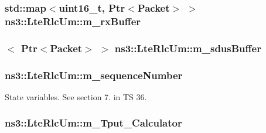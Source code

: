 \subsubsection[{\texorpdfstring{m\+\_\+rx\+Buffer}{m_rxBuffer}}]{\setlength{\rightskip}{0pt plus 5cm}std\+::map$<$uint16\+\_\+t, {\bf Ptr}$<${\bf Packet}$>$ $>$ ns3\+::\+Lte\+Rlc\+Um\+::m\+\_\+rx\+Buffer\hspace{0.3cm}{\ttfamily [private]}}\hypertarget{classns3_1_1LteRlcUm_aa4611282929afb798d591eafca1e6adb}{}\label{classns3_1_1LteRlcUm_aa4611282929afb798d591eafca1e6adb}
\subsubsection[{\texorpdfstring{m\+\_\+sdus\+Buffer}{m_sdusBuffer}}]{$<$ {\bf Ptr}$<${\bf Packet}$>$ $>$ ns3\+::\+Lte\+Rlc\+Um\+::m\+\_\+sdus\+Buffer\hspace{0.3cm}{\ttfamily [private]}}\hypertarget{classns3_1_1LteRlcUm_a8c214e654b315fe09e26db669a6af268}{}\label{classns3_1_1LteRlcUm_a8c214e654b315fe09e26db669a6af268}
\subsubsection[{\texorpdfstring{m\+\_\+sequence\+Number}{m_sequenceNumber}}]{ ns3\+::\+Lte\+Rlc\+Um\+::m\+\_\+sequence\+Number\hspace{0.3cm}{\ttfamily [private]}}\hypertarget{classns3_1_1LteRlcUm_afd06062cf128aecdc2f7c3f29ea8a8ad}{}\label{classns3_1_1LteRlcUm_afd06062cf128aecdc2f7c3f29ea8a8ad}
State variables. See section 7. in TS 36. 
\subsubsection[{\texorpdfstring{m\+\_\+\+Tput\+\_\+\+Calculator}{m_Tput_Calculator}}]{ ns3\+::\+Lte\+Rlc\+Um\+::m\+\_\+\+Tput\+\_\+\+Calculator\hspace{0.3cm}{\ttfamily [private]}}\hypertarget{classns3_1_1LteRlcUm_af24ae932eded5469f4ad2185b656bee1}{}\label{classns3_1_1LteRlcUm_af24ae932eded5469f4ad2185b656bee1}
